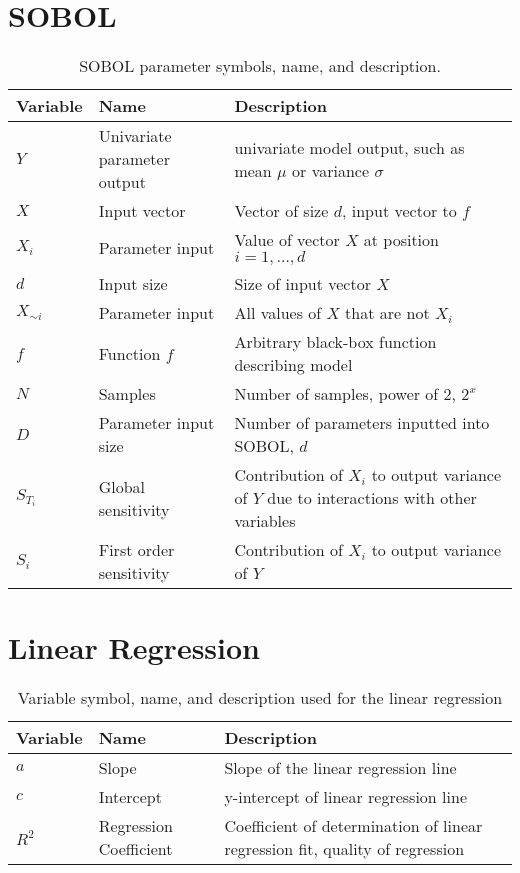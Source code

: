 \section{SOBOL}
\begin{table}[htbp]
    \small %
    \centering
    \begin{tabularx}{\textwidth}{l l X}
        \toprule
        \textbf{Variable} & \textbf{Name} & \textbf{Description} \\
        \midrule
        $Y$ & Univariate parameter output & univariate model output, such as mean $\mu$ or variance $\sigma$ \\
        $X$ & Input vector & Vector of size $d$, input vector to $f$\\
        $X_i$ & Parameter input & Value of vector $X$ at position $i=1, \dots, d$ \\
        $d$ & Input size & Size of input vector $X$\\
        $X_{\sim i}$ & Parameter input & All values of $X$ that are not $X_i$ \\
        $f$ & Function $f$& Arbitrary black-box function describing model \\
        $N$ & Samples & Number of samples, power of 2, $2^x$ \\
        $D$ & Parameter input size & Number of parameters inputted into SOBOL, $d$ \\
        $S_{T_i}$ & Global sensitivity & Contribution of $X_i$ to output variance of $Y$ due to interactions with other variables  \\
        $S_i$ & First order sensitivity & Contribution of $X_i$ to output variance of $Y$ \\
        \bottomrule
    \end{tabularx} \newline
    \caption{SOBOL parameter symbols, name, and description. }
    \label{tab:parameter_table_SOBOL}
\end{table}

\section{Linear Regression}
\begin{table}[htbp]
    \small %
    \centering
    \begin{tabularx}{\textwidth}{l l X}
        \toprule
        \textbf{Variable} & \textbf{Name} & \textbf{Description} \\
        \midrule
        $a$ & Slope & Slope of the linear regression line \\
        $c$ & Intercept & y-intercept of linear regression line\\
        $R^2$ & Regression Coefficient & Coefficient of determination of linear regression fit, quality of regression \\
        \bottomrule
    \end{tabularx}
    \caption{Variable symbol, name, and description used for the linear regression}
    \label{tab:parameter_table_linear_regression}
\end{table}

